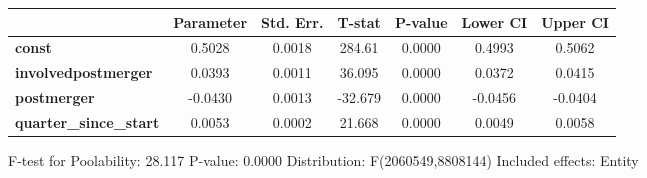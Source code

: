 \documentclass{report}
\begin{document}
\begin{center}
\begin{tabular}{lcccccc}
                               & \textbf{Parameter} & \textbf{Std. Err.} & \textbf{T-stat} & \textbf{P-value} & \textbf{Lower CI} & \textbf{Upper CI}  \\
\midrule
\textbf{const}                 &       0.5028       &       0.0018       &      284.61     &      0.0000      &       0.4993      &       0.5062       \\
\textbf{involvedpostmerger}    &       0.0393       &       0.0011       &      36.095     &      0.0000      &       0.0372      &       0.0415       \\
\textbf{postmerger}            &      -0.0430       &       0.0013       &     -32.679     &      0.0000      &      -0.0456      &      -0.0404       \\
\textbf{quarter\_since\_start} &       0.0053       &       0.0002       &      21.668     &      0.0000      &       0.0049      &       0.0058       \\
\bottomrule
\end{tabular}
\end{center}

F-test for Poolability: 28.117 \newline
 P-value: 0.0000 \newline
 Distribution: F(2060549,8808144) \newline
  \newline
 Included effects: Entity
\end{document}

